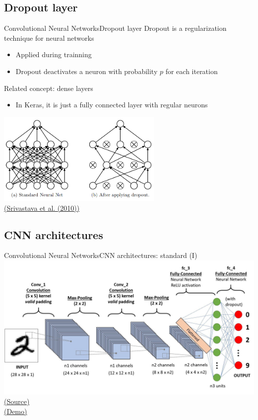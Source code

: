 \documentclass[10pt,compress]{beamer} %
\begin{document}
\subsection{Dropout layer}
\begin{frame}{Convolutional Neural Networks}{Dropout layer}
	\alert{Dropout} is a regularization technique for neural networks
	\begin{itemize}
        \item Applied during trainning
		\item Dropout deactivates a neuron with probability $p$ for each iteration
	\end{itemize}

	Related concept: \alert{dense layers}
	\begin{itemize}
		\item In Keras, it is just a fully connected layer with regular neurons
	\end{itemize}
	\centering
        \includegraphics[width=0.6\textwidth]{figs/dropout.png}\\
	\scriptsize\href{https://jmlr.org/papers/volume15/srivastava14a.old/srivastava14a.pdf}{(Srivastava et al. (2010))}
\end{frame}

\subsection{CNN architectures}
\begin{frame}{Convolutional Neural Networks}{CNN architectures: standard (I)}
	\centering
        \includegraphics[width=\textwidth]{figs/layers.png}\\
	    \scriptsize\href{https://towardsdatascience.com/a-comprehensive-guide-to-convolutional-neural-networks-the-eli5-way-3bd2b1164a53}{(Source)}\\

	\normalsize \href{https://poloclub.github.io/cnn-explainer/}{(Demo)}
\end{frame}
\end{document}
